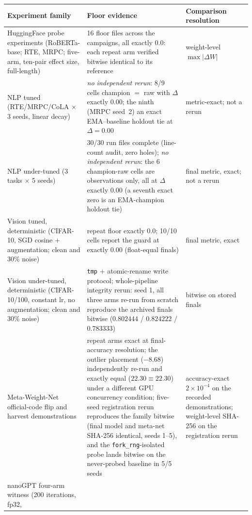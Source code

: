 \documentclass[10pt,letterpaper]{article}
\theoremstyle{remark}
\newcommand{\code}[1]{\texttt{#1}}
\begin{document}
\begin{table}[tbp]
\centering
\footnotesize
\setlength{\tabcolsep}{5pt}
\begin{tabular}{@{}L{4.4cm}L{7.6cm}L{3.2cm}@{}}
\toprule
Experiment family & Floor evidence & Comparison resolution \\
\midrule
HuggingFace probe experiments (RoBERTa-base; RTE, MRPC; five-arm,
ten-pair effect size, full-length) &
16 floor files across the campaigns, all exactly $0.0$: each repeat arm
verified bitwise identical to its reference &
weight-level $\max|\Delta W|$ \\
\addlinespace
NLP tuned (RTE/MRPC/CoLA $\times$ 3 seeds, linear decay) &
\emph{no independent rerun}: 8/9 cells champion $=$ raw with $\Delta$
exactly $0.00$;
the ninth (MRPC seed~2) an exact EMA--baseline holdout tie at
$\Delta = 0.00$ &
metric-exact; not a rerun \\
\addlinespace
NLP under-tuned (3 tasks $\times$ 5 seeds) &
30/30 run files complete (line-count audit, zero holes); \emph{no
independent rerun}: the 6 champion-raw cells are observations only, all at
$\Delta$ exactly $0.00$
(a seventh exact zero is an EMA-champion holdout tie) &
final metric, exact; not a rerun \\
\addlinespace
Vision tuned, deterministic (CIFAR-10, SGD cosine $+$ augmentation;
clean and 30\% noise) &
repeat floor exactly $0.0$; 10/10 cells report the guard at exactly
$0.00$ (float-equal finals) &
final metric, exact \\
\addlinespace
Vision under-tuned, deterministic (CIFAR-10/100, constant lr, no
augmentation; clean and 30\% noise) &
\code{tmp} $+$ atomic-rename write protocol; whole-pipeline integrity
rerun: seed 1, all three arms re-run from scratch reproduce the archived
finals bitwise ($0.802444$ / $0.824222$ / $0.783333$) &
bitwise on stored finals \\
\addlinespace
Meta-Weight-Net official-code flip and harvest demonstrations &
repeat arms exact at final-accuracy resolution; the outlier placement
($-8.68$) independently re-run and exactly equal ($22.30 \equiv 22.30$)
under a different GPU concurrency condition; five-seed registration
rerun reproduces the family bitwise (final model and meta-net SHA-256
identical, seeds 1--5), and the \code{fork\_rng}-isolated probe lands
bitwise on the never-probed baseline in 5/5 seeds &
accuracy-exact $2{\times}10^{-4}$ on the recorded demonstrations;
weight-level SHA-256 on the registration rerun \\
\addlinespace
nanoGPT four-arm witness (200 iterations, fp32,

\end{tabular}
\end{table}
\end{document}
